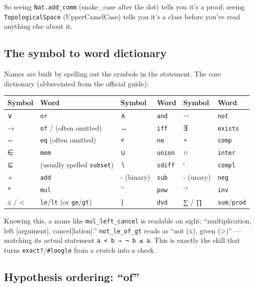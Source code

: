 So seeing \texttt{Nat.add\_comm} (snake\_case after the dot) tells you it's a proof; seeing \texttt{TopologicalSpace} (UpperCamelCase) tells you it's a class before you've read anything else about it.

\subsection{The symbol to word dictionary}

Names are built by spelling out the symbols in the statement. The core dictionary (abbreviated from the official guide):

\begin{center}
\begin{tabular}{@{}llllll@{}}
\hline
\textbf{Symbol} & \textbf{Word} & \textbf{Symbol} & \textbf{Word} & \textbf{Symbol} & \textbf{Word} \\
\hline
∨ & \texttt{or} & ∧ & \texttt{and} & ¬ & \texttt{not} \\
→ & \texttt{of} / (often omitted) & ↔ & \texttt{iff} & ∃ & \texttt{exists} \\
= & \texttt{eq} (often omitted) & ≠ & \texttt{ne} & ∘ & \texttt{comp} \\
∈ & \texttt{mem} & ∪ & \texttt{union} & ∩ & \texttt{inter} \\
⊆ & (usually spelled \texttt{subset}) & ∖ & \texttt{sdiff} & ᶜ & \texttt{compl} \\
+ & \texttt{add} & - (binary) & \texttt{sub} & - (unary) & \texttt{neg} \\
* & \texttt{mul} & \textasciicircum{} & \texttt{pow} & ⁻¹ & \texttt{inv} \\
≤ / < & \texttt{le}/\texttt{lt} (or \texttt{ge}/\texttt{gt}) & ∣ & \texttt{dvd} & ∑ / ∏ & \texttt{sum}/\texttt{prod} \\
\hline
\end{tabular}
\end{center}

Knowing this, a name like \texttt{mul\_left\_cancel} is readable on sight: ``multiplication, left [argument], cancel[lation].'' \texttt{not\_le\_of\_gt} reads as ``not (≤), given (>)'' --- matching its actual statement \texttt{a < b → ¬ b ≤ a}. This is exactly the skill that turns \texttt{exact?}/\texttt{\#loogle} from a crutch into a check.

\subsection{Hypothesis ordering: ``of''}

